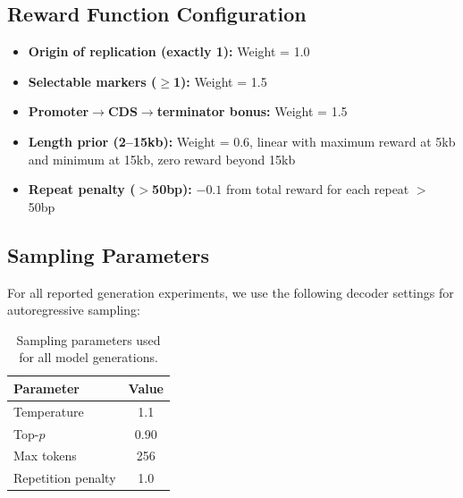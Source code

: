 \documentclass{article}
\theoremstyle{plain}
\theoremstyle{definition}
\theoremstyle{remark}
\begin{document}
\subsection{Reward Function Configuration}

\begin{itemize}
\item \textbf{Origin of replication (exactly 1):} Weight = 1.0
\item \textbf{Selectable markers ($\geq$1):} Weight = 1.5
\item \textbf{Promoter$\rightarrow$CDS$\rightarrow$terminator bonus:}
Weight = 1.5
\item \textbf{Length prior (2--15kb):} Weight = 0.6, linear with maximum
reward at 5kb and minimum at 15kb, zero reward beyond 15kb
\item \textbf{Repeat penalty ($>$50bp):} $-0.1$ from total reward for
each repeat $>$ 50bp
\end{itemize}

\subsection{Sampling Parameters}

For all reported generation experiments, we use the following decoder
settings for autoregressive sampling:

\begin{table}[h]
\caption{Sampling parameters used for all model generations.}
\label{tab:sampling_params}
\vskip 0.15in
\begin{center}
\begin{small}
\begin{sc}
\begin{tabular}{lc}
\toprule
Parameter & Value \\
\midrule
Temperature        & 1.1   \\
Top-$p$            & 0.90  \\
Max tokens         & 256   \\
Repetition penalty & 1.0   \\
\bottomrule
\end{tabular}
\end{sc}
\end{small}
\end{center}
\vskip -0.1in
\end{table}
\end{document}
